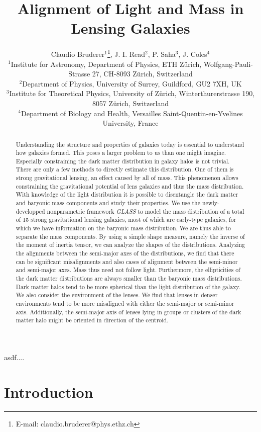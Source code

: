 \documentclass[useAMS,usenatbib]{mn2e}
\title[Alignment of Light and Mass in Lensing Galaxies]{Alignment of Light and Mass in Lensing Galaxies}
\author[Bruderer]{Claudio Bruderer$^{1}$\thanks{E-mail: claudio.bruderer@phys.ethz.ch}, J. I. Read$^{2}$, P. Saha$^{3}$, J. Coles$^{4}$\\
$^{1}$Institute for Astronomy, Department of Physics, ETH Z\"urich, Wolfgang-Pauli-Strasse 27, CH-8093 Z\"urich, Switzerland\\
$^{2}$Department of Physics, University of Surrey, Guildford, GU2 7XH, UK\\
$^{3}$Institute for Theoretical Physics, University of Z\"urich, Winterthurerstrasse 190, 8057 Z\"urich, Switzerland\\
$^{4}$Department of Biology and Health, Versailles Saint-Quentin-en-Yvelines University, France
}
\begin{document}
\maketitle

\begin{abstract}
Understanding the structure and properties of galaxies today is essential to understand how galaxies formed. This poses a larger problem to us than one might imagine. Especially constraining the dark matter distribution in galaxy halos is not trivial. There are only a few methods to directly estimate this distribution. One of them is strong gravitational lensing, an effect caused by all of mass. This phenomenon allows constraining the gravitational potential of lens galaxies and thus the mass distribution. With knowledge of the light distribution it is possible to disentangle the dark matter and baryonic mass components and study their properties.
We use the newly-developped nonparametric framework \textit{GLASS} to model the mass distribution of a total of 15 strong gravitational lensing galaxies, most of which are early-type galaxies, for which we have information on the baryonic mass distribution. We are thus able to separate the mass components. By using a simple shape measure, namely the inverse of the moment of inertia tensor, we can analyze the shapes of the distributions. Analyzing the alignments between the semi-major axes of the distributions, we find that there can be significant misalignments and also cases of alignment between the semi-minor and semi-major axes. Mass thus need not follow light. Furthermore, the ellipticities of the dark matter distributions are always smaller than the baryonic mass distributions. Dark matter halos tend to be more spherical than the light distribution of the galaxy. We also consider the environment of the lenses. We find that lenses in denser environments tend to be more misaligned with either the semi-major or semi-minor axis. Additionally, the semi-major axis of lenses lying in groups or clusters of the dark matter halo might be oriented in direction of the centroid.
\end{abstract}

\begin{keywords}
asdf....
\end{keywords}


\section{Introduction}\label{sec:introduction}
\end{document}
